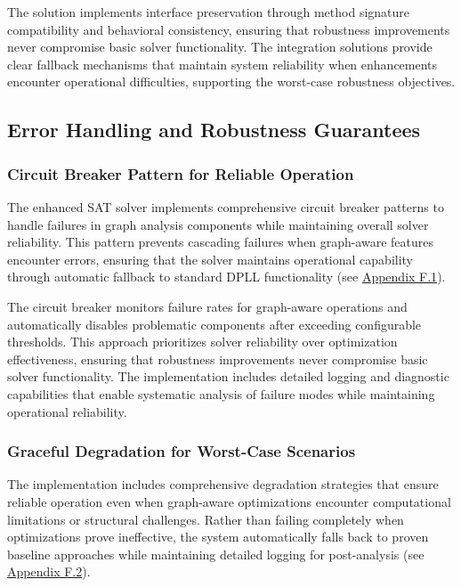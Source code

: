 The solution implements interface preservation through method signature compatibility and behavioral consistency, ensuring that robustness improvements never compromise basic solver functionality. The integration solutions provide clear fallback mechanisms that maintain system reliability when enhancements encounter operational difficulties, supporting the worst-case robustness objectives.

\subsection{Error Handling and Robustness Guarantees}

\subsubsection{Circuit Breaker Pattern for Reliable Operation}

The enhanced SAT solver implements comprehensive circuit breaker patterns to handle failures in graph analysis components while maintaining overall solver reliability. This pattern prevents cascading failures when graph-aware features encounter errors, ensuring that the solver maintains operational capability through automatic fallback to standard DPLL functionality (see \hyperref[appendix:circuit-breaker]{Appendix F.1}).

The circuit breaker monitors failure rates for graph-aware operations and automatically disables problematic components after exceeding configurable thresholds. This approach prioritizes solver reliability over optimization effectiveness, ensuring that robustness improvements never compromise basic solver functionality. The implementation includes detailed logging and diagnostic capabilities that enable systematic analysis of failure modes while maintaining operational reliability.

\subsubsection{Graceful Degradation for Worst-Case Scenarios}

The implementation includes comprehensive degradation strategies that ensure reliable operation even when graph-aware optimizations encounter computational limitations or structural challenges. Rather than failing completely when optimizations prove ineffective, the system automatically falls back to proven baseline approaches while maintaining detailed logging for post-analysis (see \hyperref[appendix:graceful-degradation]{Appendix F.2}).

